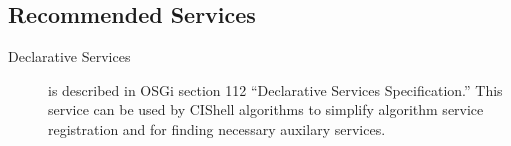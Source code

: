 \subsection*{Recommended Services}
\begin{description}
  \item[Declarative Services] is described in OSGi section 112 ``Declarative
  Services Specification.'' This service can be used by CIShell algorithms to
  simplify algorithm service registration and for finding necessary auxilary services.
\end{description}
